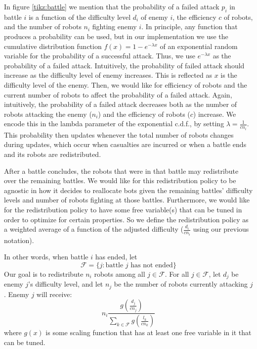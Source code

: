 \documentclass[11pt]{article}
\theoremstyle{definition}
\begin{document}
In figure \ref{tikz:battle} we mention that the probability of a failed attack
$p_i$ in battle $i$ is a function of the difficulty level $d_i$ of enemy $i$,
the efficiency $c$ of robots, and the number of robots $n_i$ fighting enemy
$i$.
%
In principle, any function that produces a probability can be used, but in our
implementation we use the cumulative distribution function
$f(x) = 1 - e^{-\lambda x}$ of an exponential random variable for the
probability of a successful attack.
%
Thus, we use $e^{-\lambda x}$ as the probability of a failed attack.
%
Intuitively, the probability of failed attack should increase as the difficulty
level of enemy increases.
This is reflected as $x$ is the difficulty level
of the enemy.
Then, we would like for efficiency of robots and the current number of robots
to affect the probability of a failed attack.
Again, intuitively, the probability of a failed attack decreases both as the
number of robots attacking the enemy ($n_i$) and the efficiency of robots ($c$)
increase.
We encode this in the lambda parameter of the exponential c.d.f., by setting
$\lambda = \frac{1}{c n_i}$.
This probability then updates whenever the total number of robots changes
during updates, which occur when casualties are incurred or when a battle ends
and its robots are redistributed.

After a battle concludes, the robots that were
in that battle may redistribute over the remaining battles.
We would like for this redistribution policy
to be agnostic in how it decides to reallocate
bots given the remaining battles' difficulty
levels and number of robots fighting at those battles.
Furthermore, we would like for the redistribution
policy to have some free variable(s) that can be
tuned in order to optimize for certain properties.
%
So we define the redistribution policy as a weighted
average of a function of the adjusted difficulty
($\frac{d_i}{c n_i}$ using our previous notation).

In other words, when battle $ i $ has ended,
let
\begin{equation*}
    \mathcal{F} = \{
        j : \text{battle } j \text{ has not ended}
    \}
\end{equation*}
%
Our goal is to redistribute $ n_i $ robots among
all $ j \in \mathcal{F} $.
%
For all $ j \in \mathcal{F} $, let $ d_j $ be enemy
$j$'s difficulty level, and let $ n_j $ be the number
of robots currently attacking $j$.
Enemy $j$ will receive:
\begin{equation*}
    n_i \frac{g(\frac{d_j}{c n_j})}{
        {\displaystyle\sum_{k \in \mathcal{F}}}
        g(\frac{l_k}{c n_k})}
\end{equation*}
%
where $g(x)$ is some scaling function that has at least one free variable in
it that can be tuned.
\end{document}

